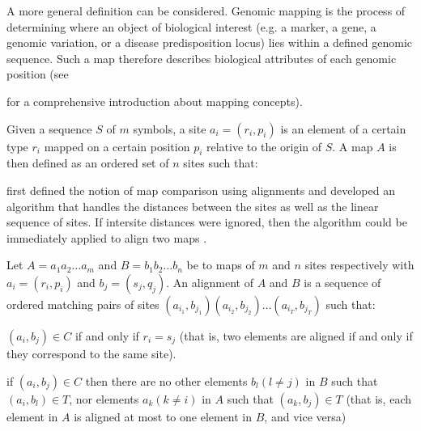 A more general definition can be considered. Genomic mapping
 is the process of determining where an object
of biological interest (e.g. a marker, a gene, a genomic variation, or a disease predisposition locus) lies
within a defined genomic sequence. Such a map therefore describes biological attributes of each genomic
position (see {\citet{white:2005a} for a comprehensive introduction about mapping concepts).


\label{subsec:maps}

Given a sequence $S$ of $m$ symbols, a site $a_i=(r_i,p_i)$ is an element of a certain type $r_i$ mapped 
on a certain position $p_i$ relative to the origin of $S$. A map $A$ is then defined as an ordered set of 
$n$ sites such that:
\begin{center}
\end{center}

\citet{waterman:1984c} first defined the notion of map comparison using alignments and developed an
algorithm that handles the distances between the sites as well as the linear sequence of sites. If
intersite distances were ignored, then the \citeauthor{sellers:1974a} algorithm could be immediately
applied to align two maps \citep{huang:1992a}.

Let $A = a_1 a_2 \ldots a_m$ and $B = b_1 b_2 \ldots b_n$ be to maps of $m$ and $n$ sites respectively
with $a_i=(r_i,p_i)$ and $b_j=(s_j,q_j)$. An alignment of $A$ and $B$ is a sequence of ordered matching 
pairs of sites $(a_{i_1},b_{j_1})(a_{i_2},b_{j_2}) \ldots (a_{i_T},b_{j_T})$ such that:

\begin{menumerate}
\item $(a_i,b_j) \in C$ if and only if $r_i = s_j$ (that is, two elements are aligned if and only if 
they correspond to the same site).
 
\item if $(a_i,b_j) \in C$ then there are no other elements $b_l (l \neq j)$ in
$B$ such that $(a_i,b_l) \in T$, nor elements $a_k (k \neq i)$ in $A$  such that
$(a_k,b_j) \in T$ (that is, each element in $A$ is aligned at most
to one element in $B$, and vice versa)
 

\end{menumerate}}
